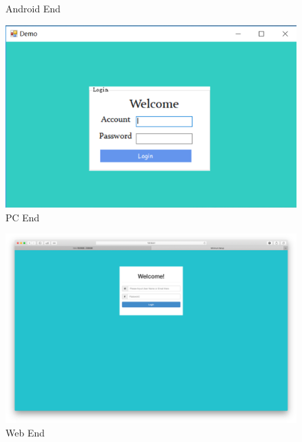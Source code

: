 \documentclass{article}
\begin{document}
\begin{figure}[H]
\begin{minipage}[b]{0.28\linewidth}
 			\caption{Android End}
	 		\label{fig1}
 		\end{minipage}
 		\begin{minipage}[b]{0.68\linewidth} 		
 	 		\centering
 			\includegraphics{img/login3.png}
 			\caption{PC End}
	 	\end{minipage}
 	\end{figure}
 	
 	 \begin{figure}[H]
 	 \centering
 		\includegraphics[width=\linewidth]{img/login1.png}
 		\caption{Web End}
 	\end{figure}
 
\end{document}
